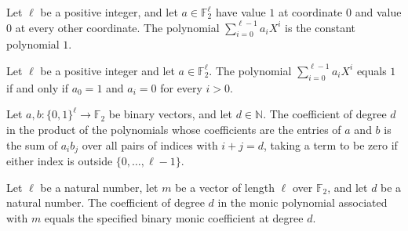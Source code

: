 \begin{theorem}
\label{FABL.binaryLowPolynomial_binaryOneCoefficients}
\leanok
{}
Let $\ell$ be a positive integer, and let $a\in\mathbb F_2^\ell$ have value $1$ at
coordinate $0$ and value $0$ at every other coordinate. The polynomial
$\sum_{i=0}^{\ell-1} a_iX^i$ is the constant polynomial $1$.
\end{theorem}

\begin{theorem}
\label{FABL.binaryLowPolynomial_eq_one_iff}
\leanok
{}
Let $\ell$ be a positive integer and let $a\in\mathbb F_2^\ell$. The polynomial
$\sum_{i=0}^{\ell-1}a_iX^i$ equals $1$ if and only if $a_0=1$ and $a_i=0$ for every
$i>0$.
\end{theorem}

\begin{theorem}
\label{FABL.binaryConvolutionCoefficient_eq_coeff_mul}
\leanok
{}
Let $a,b\colon\{0,1\}^{\ell}\to\mathbb{F}_2$ be binary vectors, and let
$d\in\mathbb{N}$. The coefficient of degree $d$ in the product of the polynomials whose
coefficients are the entries of $a$ and $b$ is the sum of $a_i b_j$ over all pairs of
indices with $i+j=d$, taking a term to be zero if either index is outside
$\{0,\ldots,\ell-1\}$.
\end{theorem}

\begin{theorem}
\label{FABL.binaryMonicCoefficient_eq_coeff}
\leanok
{}
Let $\ell$ be a natural number, let $m$ be a vector of length $\ell$ over
$\mathbb{F}_2$, and let $d$ be a natural number. The coefficient of degree $d$ in the
monic polynomial associated with $m$ equals the specified binary monic coefficient at
degree $d$.
\end{theorem}

